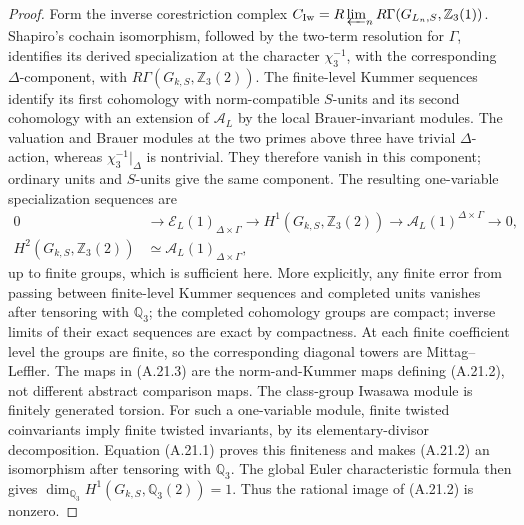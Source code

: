 \begin{proof}
Form the inverse corestriction complex
\(C_{\rm Iw}=R\varprojlim_nR\Gamma(G_{L_n,S},\mathbb Z_3(1))\).
Shapiro's cochain isomorphism, followed by the two-term
resolution for \(\Gamma\), identifies its derived
specialization at the character \(\chi_3^{-1}\), with
the corresponding \(\Delta\)-component, with
\(R\Gamma(G_{k,S},\mathbb Z_3(2))\).
The finite-level Kummer sequences identify its first
cohomology with norm-compatible \(S\)-units and its
second cohomology with an extension of
\(\mathcal A_L\) by the local Brauer-invariant modules.
The valuation and Brauer modules at the two primes
above three have trivial \(\Delta\)-action, whereas
\(\chi_3^{-1}|_\Delta\) is nontrivial. They therefore
vanish in this component; ordinary units and
\(S\)-units give the same component. The resulting
one-variable specialization sequences are
\[
\begin{split}
0&\longrightarrow\mathcal E_L(1)_{\Delta\times\Gamma}
 \longrightarrow H^1(G_{k,S},\mathbb Z_3(2))
 \longrightarrow\mathcal A_L(1)^{\Delta\times\Gamma}
 \longrightarrow0,\\
H^2(G_{k,S},\mathbb Z_3(2))
 &\simeq\mathcal A_L(1)_{\Delta\times\Gamma},
\end{split}                                                   \tag{A.21.3}
\]
up to finite groups, which is sufficient here. More
explicitly, any finite error from passing between
finite-level Kummer sequences and completed units
vanishes after tensoring with \(\mathbb Q_3\); the
completed cohomology groups are compact; inverse limits
of their exact sequences are exact by compactness. At
each finite coefficient level the groups are finite,
so the corresponding diagonal towers are Mittag--Leffler. The maps in (A.21.3) are the
norm-and-Kummer maps defining (A.21.2), not different
abstract comparison maps. The class-group Iwasawa
module is finitely generated torsion. For such a
one-variable module, finite twisted coinvariants imply
finite twisted invariants, by its elementary-divisor
decomposition. Equation (A.21.1) proves this finiteness
and makes (A.21.2) an isomorphism after tensoring with
\(\mathbb Q_3\). The global Euler characteristic formula
then gives
\(\dim_{\mathbb Q_3}H^1(G_{k,S},\mathbb Q_3(2))=1\).
Thus the rational image of (A.21.2) is nonzero.


\end{proof}
